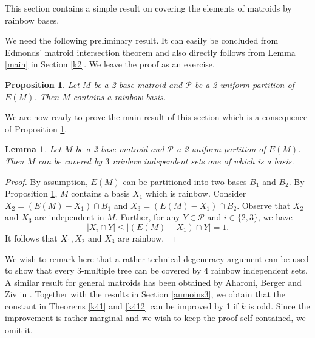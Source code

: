 \documentclass{article}
\newtheorem{Proposition}[Statement]{Proposition}
\newtheorem{Lemma}[Statement]{Lemma}
\begin{document}
This section contains a simple result on covering the elements of matroids by rainbow bases. %

We need the following preliminary result. It can easily be concluded from Edmonds' matroid intersection theorem \cite{e4} and also directly follows from Lemma \ref{main} in Section \ref{k2}. We leave the proof as an exercise.

\begin{Proposition}\label{dfqdqw}
Let $M$ be a 2-base matroid and $\mathcal{P}$ be a 2-uniform partition of $E(M)$. Then $M$ contains a rainbow basis.
\end{Proposition}
We are now ready to prove the main result of this section which is a consequence of Proposition \ref{dfqdqw}.

\begin{Lemma}\label{fzu}
Let $M$ be a 2-base matroid and $\mathcal{P}$ a 2-uniform partition of $E(M)$. Then $M$ can be covered by $3$ rainbow independent sets one of which is a basis.
\end{Lemma}
\begin{proof}
By assumption, $E(M)$ can be partitioned into two bases $B_1$ and $B_2$. %
 By Proposition \ref{dfqdqw}, $M$ contains a basis $X_1$ which is rainbow. Consider $X_2=(E(M)-X_1)\cap B_1$ and $X_3=(E(M)-X_1)\cap B_2$. Observe that $X_2$ and $X_3$ are independent in $M$. Further, for any $Y \in \mathcal{P
}$ and $i \in \{2,3\}$, we have $$| X_i \cap Y|\leq | (E(M)-X_1) \cap Y|=1.$$ It follows that  $X_1,X_2$ and $X_3$ are rainbow.
\end{proof}

 We wish to remark here that a rather technical degeneracy argument can be used to show that every $3$-multiple tree can be covered by 4 rainbow independent sets. A similar result for general matroids has been obtained by Aharoni, Berger and Ziv in \cite{ABZ}. Together with the results in Section \ref{aumoins3}, we obtain that the constant in Theorems \ref{k41} and \ref{k412} can be improved by 1 if $k$ is odd. Since the improvement is rather marginal and we wish to keep the proof self-contained, we omit it.

\end{document}
